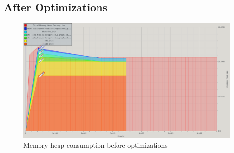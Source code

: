 \begin{landscape}
\subsection{After Optimizations}
\begin{figure}[H]
 \centering
 \includegraphics[scale=0.6]{img/memory_now.png}
 \caption{Memory heap consumption before optimizations}
 \label{fig:memory_now}
\end{figure}

\end{landscape}